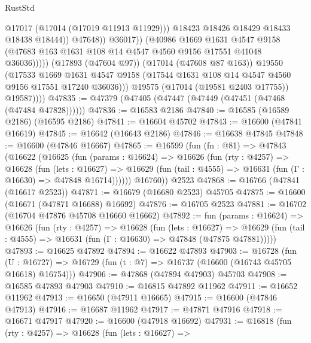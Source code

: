 \begin{lexlean}{RustStd}
\begin{coremodule}
                                  @17017
                                  (@17014 (@17019 @11913 @11929)))
                                @18423
                                @18426
                                @18429
                                @18433
                                @18438
                                @18444))
                            @47648))
                        @36017))
                    (@40986
                      @1669
                      @1631
                      @4547
                      @9158
                      (@47683 @163 @1631 @108 @14 @4547 @4560 @9156 @17551 @41048 @36036)))))
              (@17893 (@47604 @97))
              (@17014 (@47608 @87 @163))
              @19550
              (@17533
                @1669
                @1631
                @4547
                @9158
                (@17544 @1631 @108 @14 @4547 @4560 @9156 @17551 @17240 @36036)))
            @19575
            (@17014 (@19581 @2403 @17755))
            @19587))))
@47835 := @47379 (@47405 (@47447 (@47449 (@47451 (@47468 (@47484 @47828))))))
@47836 := @16583 @2186
@47840 := @16585 (@16589 @2186) (@16595 @2186)
@47841 := @16604 @45702
@47843 := @16600 (@47841 @16619)
@47845 := @16642 (@16643 @2186)
@47846 := @16638 @47845
@47848 := @16600 (@47846 @16667)
@47865 := @16599
    (fun (fn : @81) =>
    @47843
      (@16622
        (@16625
          (fun (params : @16624) =>
          @16626
            (fun (rty : @4257) =>
            @16628
              (fun (lets : @16627) =>
              @16629 (fun (tail : @4555) => @16631 (fun (Γ : @16630) => @47848 @16714))))))
        @16760))
    @2523
@47868 := @16766 (@47841 (@16617 @2523))
@47871 := @16679 (@16680 @2523) @45705
@47875 := @16600 (@16671 (@47871 @16688) @16692)
@47876 := @16705 @2523
@47881 := @16702 (@16704 @47876 @45708 @16660 @16662)
@47892 := fun (params : @16624) =>
  @16626
    (fun (rty : @4257) =>
    @16628
      (fun (lets : @16627) =>
      @16629 (fun (tail : @4555) => @16631 (fun (Γ : @16630) => @47848 (@47875 @47881)))))
@47893 := @16625 @47892
@47894 := @16622 @47893
@47903 := @16728
    (fun (U : @16727) => @16729 (fun (t : @7) => @16737 (@16600 (@16743 @45705 @16618) @16754)))
@47906 := @47868 (@47894 @47903) @45703
@47908 := @16585 @47893 @47903
@47910 := @16815 @47892 @11962
@47911 := @16652 @11962
@47913 := @16650 (@47911 @16665)
@47915 := @16600 (@47846 @47913)
@47916 := @16687 @11962
@47917 := @47871 @47916
@47918 := @16671 @47917
@47920 := @16600 (@47918 @16692)
@47931 := @16818
    (fun (rty : @4257) =>
    @16628
      (fun (lets : @16627) =>

\end{coremodule}
\end{lexlean}
